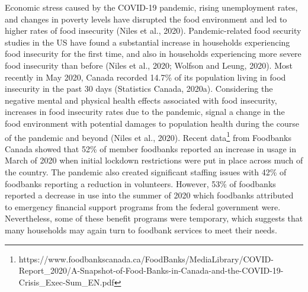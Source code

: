 \documentclass[]{elsarticle} %
\begin{document}
Economic stress caused by the COVID-19 pandemic, rising unemployment
rates, and changes in poverty levels have disrupted the food environment
and led to higher rates of food insecurity (Niles et al., 2020).
Pandemic-related food security studies in the US have found a
substantial increase in households experiencing food insecurity for the
first time, and also in households experiencing more severe food
insecurity than before (Niles et al., 2020; Wolfson and Leung, 2020).
Most recently in May 2020, Canada recorded 14.7\% of its population
living in food insecurity in the past 30 days (Statistics Canada,
2020a). Considering the negative mental and physical health effects
associated with food insecurity, increases in food insecurity rates due
to the pandemic, signal a change in the food environment with potential
damages to population health during the course of the pandemic and
beyond (Niles et al., 2020). Recent data\footnote{https://www.foodbankscanada.ca/FoodBanks/MediaLibrary/COVID-Report\_2020/A-Snapshot-of-Food-Banks-in-Canada-and-the-COVID-19-Crisis\_Exec-Sum\_EN.pdf}
from Foodbanks Canada showed that 52\% of member foodbanks reported an
increase in usage in March of 2020 when initial lockdown restrictions
were put in place across much of the country. The pandemic also created
significant staffing issues with 42\% of foodbanks reporting a reduction
in volunteers. However, 53\% of foodbanks reported a decrease in use
into the summer of 2020 which foodbanks attributed to emergency
financial support programs from the federal government were.
Nevertheless, some of these benefit programs were temporary, which
suggests that many households may again turn to foodbank services to
meet their needs.
\end{document}
